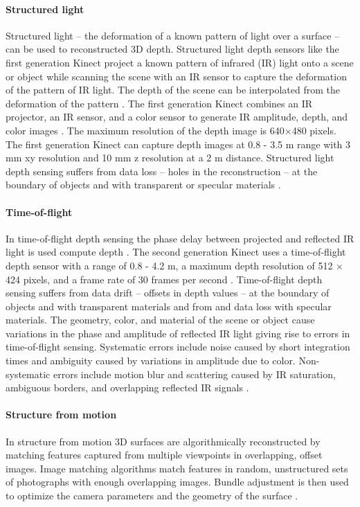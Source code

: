 \documentclass{article}
\begin{document}
\paragraph{Structured light}
Structured light -- the deformation of a known pattern of light over a surface -- can be used to reconstructed 3D depth. 
%
Structured light depth sensors like the first generation Kinect 
project a known pattern of infrared (IR) light onto a scene or object 
while scanning the scene with an IR sensor
to capture the deformation of the pattern of IR light. 
The depth of the scene can be interpolated from the deformation of the pattern
\citep{Hansard2013}. 
%
The first generation Kinect combines an IR projector, an IR sensor, and a color sensor 
to generate IR amplitude, depth, and color images \citep{Smisek2011,Hansard2013}. 
The maximum resolution of the depth image is 640×480 pixels. 
%
The first generation Kinect can capture depth images
at 0.8 - 3.5 m range 
with 3 mm xy resolution and 10 mm z resolution at a 2 m distance. 
%
Structured light depth sensing suffers from data loss -- holes in the reconstruction -- 
at the boundary of objects and with transparent or specular materials \citep{Hansard2013}. 

\paragraph{Time-of-flight}
In time-of-flight depth sensing
the phase delay between projected and reflected IR light 
is used compute depth \citep{Hansard2013}. 
%
The second generation Kinect uses a time-of-flight depth sensor 
with a range of 0.8 - 4.2 m, a maximum depth resolution of 512 × 424 pixels, and a frame rate of 30 frames per second \citep{Bamji2015}. 
%
Time-of-flight depth sensing suffers from data drift -- offsets in depth values -- 
at the boundary of objects and with transparent materials 
and from and data loss with specular materials.
%
The geometry, color, and material of the scene or object cause 
variations in the phase and amplitude of reflected IR light giving rise to errors in time-of-flight sensing. 
%
Systematic errors include noise caused by short integration times
and ambiguity caused by variations in amplitude due to color. 
%
Non-systematic errors include motion blur 
and scattering caused by IR saturation, ambiguous borders, and overlapping reflected IR signals 
\citep{Hansard2013}. 

\paragraph{Structure from motion}
In structure from motion 
3D surfaces are algorithmically reconstructed 
by matching features captured from multiple viewpoints in overlapping, offset images. 
%
Image matching algorithms match features in random, unstructured sets of photographs 
with enough overlapping images.
Bundle adjustment is then used to optimize the camera parameters and the geometry of the surface 
\citep{Westoby2012, Fonstad2013,Snavely2008}. 
\end{document}

